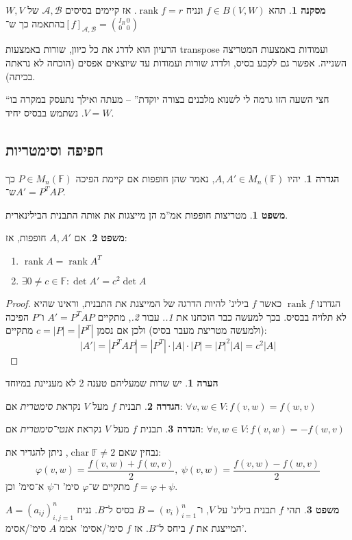 \documentclass[a4paper]{article}
\newcommand\ac    {\mathcal{A}}
\newcommand\bc    {\mathcal{B}}
\DeclareMathOperator{\chr}     {char}
\DeclareMathOperator{\rk}      {rank}
\newcommand\F         {\mathbb{F}}
\newcommand\co        {\colon}
\newcommand\sof[1]    {\left | #1 \right |}
\renewcommand\phi     {\varphi}
\theoremstyle{definition}
\newtheorem{Theorem}{משפט}
\newtheorem{definition}{הגדרה}
\newtheorem{Remark}{הערה}
\newtheorem{Collary}{מסקנה}
\newcommand\cola [1] {\begin{Collary}#1\end{Collary}}
\newcommand\theo  [1] {\begin{Theorem}#1\end{Theorem}}
\newcommand\defi  [1] {\begin{definition}#1\end{definition}}
\newcommand\rmark [1] {\begin{Remark}#1\end{Remark}}
\begin{document}
	\cola{תהא $f \in B(V, W)$ ונניח $\rk f = r$. אז קיימים בסיסים $\ac, \bc$ של $W, V$ בהתאמה כך ש־$[f]_{\ac, \bc} = \binom{I_R \, 0}{0\,\,\,\, 0}$}
	הרעיון הוא לדרג את כל כיוון, שורות באמצעות transpose ועמודות באמצעות המטריצה השנייה. אפשר גם לקבע בסיס, ולדרג שורות ועמודות עד שיוצאים אפסים (הוכחה לא נראתה בכיתה). 
	
	``חצי השעה הזו גרמה לי לשנוא מלבנים בצורה יוקדת'' – מעתה ואילך נתעסק במקרה בו $V = W$. נשתמש בבסיס יחיד. 
	
	\subsection{חפיפה וסימטריות}
	\defi{יהיו $A, A' \in M_n(\F)$, נאמר שהן חופפות אם קיימת הפיכה $P \in M_n(\F)$ כך ש־$A' = P^TAP$. }
	\theo{מטריצות חופפות אמ''מ הן מייצגות את אותה התבנית הבילינארית. }
	\theo{אם $A, A'$ חופפות, אז: 
		\begin{enumerate}
			\item \hfil $\rk A = \rk A^T$
			\item \hfil $\exists 0 \neq c \in \F \co \det A' = c^2 \det A$
	\end{enumerate}}
	\begin{proof}
		הגדרנו $\rk f$ כאשר $f$ בילינ' להיות הדרגה של המייצגת את התבנית, וראינו שהיא לא תלויה בבסיס. בכך למעשה כבר הוכחנו את \textit{1.}. עבור \textit{2.}, מתקיים $A' = P^TAP$ ו־$P$ הפיכה (ולמעשה מטריצת מעבר בסיס) ולכן אם נסמן $c = |P| = |P^T|$ מתקיים: 
		\[ |A'| = |P^TAP| = |P^T| \cdot |A| \cdot |P| = \sof{P}^2\sof{A} = c^2 |A| \]
	\end{proof}
	\rmark{יש שדות שמעליהם טענה 2 לא מעניינת במיוחד}
	
	\defi{תבנית $f$ מעל $V$ נקראת \textit{סימטרית} אם: \hfill $\forall v, w \in V \co f(v, w) = f(w, v)$}
	\defi{תבנית $f$ מעל $V$ נקראת \textit{אנטי־סימטרית} אם: \hfill $\forall v, w \in V \co f(v, w) = -f(w, v)$}
	נבחין שאם $\chr \F \neq 2$, ניתן להגדיר את: 
	\[ \phi(v, w) = \frac{f(v, w) + f(w, v)}{2}, \ \psi(v, w) = \frac{f(v, w) - f(w, v)}{2} \]
	מתקיים ש־$\phi$ סימ' ו־$\psi$ א־סימ' וכן $f = \phi + \psi$. 
	
	\theo{תהי $f$ תבנית בילינ' על $V$, ו־$B = (v_i)_{i = 1}^{n}$ בסיס ל־$B$. נניח $A =(a_{ij})^{n}_{i, j = 1}$ המייצגת את $f$ ביחס ל־$B$. אז $f$ סימ'/אסימ' אממ $A$ סימ'/אסימ'. }
	
\end{document}
